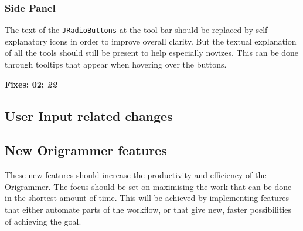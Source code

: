 \subsubsection{Side Panel}

The text of the \texttt{JRadioButtons} at the tool bar should be replaced by self-explanatory icons in order to improve overall clarity. But the textual explanation of all the tools should still be present to help especially novizes. This can be done through tooltips that appear when hovering over the buttons.

\textbf{Fixes: 02; \emph{22}}

\subsection{User Input related changes}

\subsection{New Origrammer features}

These new features should increase the productivity and efficiency of the Origrammer. The focus should be set on maximising the work that can be done in the shortest amount of time. This will be achieved by implementing features that either automate parts of the workflow, or that give new, faster possibilities of achieving the goal.